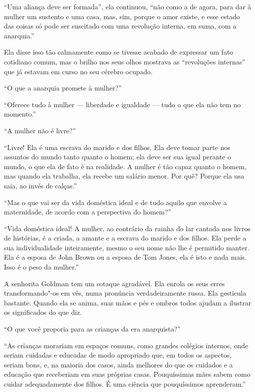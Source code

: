``Uma aliança deve ser formada'', ela continuou, ``não como a de agora,
para dar à mulher um sustento e uma casa, mas, sim, porque o amor
existe, e esse estado das coisas só pode ser suscitado com uma revolução
interna, em suma, com a anarquia.''

Ela disse isso tão calmamente como se tivesse acabado de expressar um
fato cotidiano comum, mas o brilho nos seus olhos mostrava as
``revoluções internas'' que já estavam em curso no seu cérebro ocupado.

``O que a anarquia promete à mulher?''

``Oferece tudo à mulher --- liberdade e igualdade --- tudo o que ela não
tem no momento.''

``A mulher não é livre?''

``Livre! Ela é uma escrava do marido e dos filhos. Ela deve tomar parte
nos assuntos do mundo tanto quanto o homem; ela deve ser sua igual
perante o mundo, o que ela de fato é na realidade. A mulher é tão capaz
quanto o homem, mas quando ela trabalha, ela recebe um salário menor.
Por quê? Porque ela usa saia, ao invés de calças.''

``Mas o que vai ser da vida doméstica ideal e de tudo aquilo que envolve
a maternidade, de acordo com a perspectiva do homem?''

``Vida doméstica ideal! A mulher, ao contrário da rainha do lar cantada
nos livros de histórias, é a criada, a amante e a escrava do marido e dos
filhos. Ela perde a sua individualidade inteiramente, mesmo o seu nome
não lhe é permitido manter. Ela é a esposa de John Brown ou a esposa de
Tom Jones, ela é isto e nada mais. Isso é o peso da mulher.'' %

A senhorita Goldman tem um sotaque agradável. Ela enrola os seus erres
transformando"-os em vês, numa pronúncia verdadeiramente russa. Ela
gesticula bastante. Quando ela se anima, suas mãos e pés e ombros todos
ajudam a ilustrar os significados do que diz.

``O que você proporia para as crianças da era anarquista?''

``As crianças morariam em espaços comuns, como grandes colégios
internos, onde seriam cuidadas e educadas de modo apropriado que, em
todos os aspectos, seriam bons, e, na maioria dos casos, ainda
melhores do que os cuidados e a educação que receberiam em suas próprias
casas. Pouquíssimas mães sabem como cuidar adequadamente dos filhos. É
uma ciência que pouquíssimos aprenderam.''

